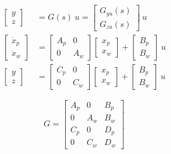\begin{examplesection}
    \begin{align*}
        \begin{bmatrix}
            y \\
            z
        \end{bmatrix}
         & = G(s) \: u = \begin{bmatrix}
                             G_{yu}(s) \\
                             G_{zu}(s)
                         \end{bmatrix} \: u \\
        \begin{bmatrix}
            \dot{x}_p \\
            \dot{x}_w
        \end{bmatrix}
         & = \begin{bmatrix}
                 A_p & 0   \\
                 0   & A_w
             \end{bmatrix}
        \begin{bmatrix}
            x_p \\
            x_w
        \end{bmatrix}
        + \begin{bmatrix}
              B_p \\
              B_w
          \end{bmatrix} \: u                \\
        \begin{bmatrix}
            y \\
            z
        \end{bmatrix}
         & = \begin{bmatrix}
                 C_p & 0   \\
                 0   & C_w
             \end{bmatrix}
        \begin{bmatrix}
            x_p \\
            x_w
        \end{bmatrix}
        +
        \begin{bmatrix}
            B_p \\
            B_w
        \end{bmatrix}
        \: u
    \end{align*}

    \begin{equation*}
        G = \left[
            \begin{array}{cc|c} %
                A_p & 0   & B_p \\
                0   & A_w & B_w \\
                \hline %
                C_p & 0   & D_p \\
                0   & C_w & D_w
            \end{array}
            \right]
    \end{equation*}

\end{examplesection}

